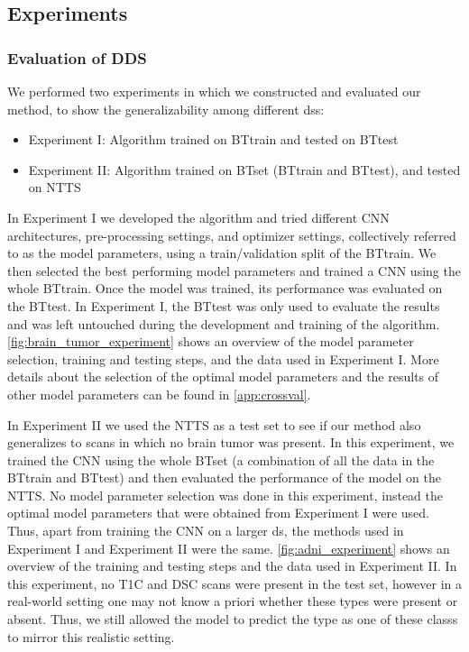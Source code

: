\subsection{Experiments}
\label{sec:experiments}

\subsubsection{Evaluation of \gls{DDS}}

We performed two experiments in which we constructed and evaluated our method, to show the generalizability among different \glspl{ds}:

\begin{itemize}
    \item Experiment I: Algorithm trained on \gls{BTtrain} and tested on \gls{BTtest}
    \item Experiment II: Algorithm trained on \gls{BTset} (\gls{BTtrain} and \gls{BTtest}), and tested on \gls{NTTS}
\end{itemize}

In Experiment I we developed the algorithm and tried different \gls{CNN} architectures, pre-processing settings, and optimizer settings, collectively referred to as the model parameters, using a train/validation split of the \gls{BTtrain}.
We then selected the best performing model parameters and trained a \gls{CNN} using the whole \gls{BTtrain}.
Once the model was trained, its performance was evaluated on the \gls{BTtest}.
In Experiment I, the \gls{BTtest} was only used to evaluate the results and was left untouched during the development and training of the algorithm.
\cref{fig:brain_tumor_experiment} shows an overview of the model parameter selection, training and testing steps, and the data used in Experiment I.
More details about the selection of the optimal model parameters and the results of other model parameters can be found in \cref{app:crossval}.

In Experiment II we used the \gls{NTTS} as a test set to see if our method also generalizes to \glspl{scan} in which no brain tumor was present.
In this experiment, we trained the \gls{CNN} using the whole \gls{BTset} (a combination of all the data in the \gls{BTtrain} and \gls{BTtest}) and then evaluated the performance of the model on the \gls{NTTS}.
No model parameter selection was done in this experiment, instead the optimal model parameters that were obtained from Experiment I were used.
Thus, apart from training the \gls{CNN} on a larger \gls{ds}, the methods used in Experiment I and Experiment II were the same.
\cref{fig:adni_experiment} shows an overview of the training and testing steps and the data used in Experiment II.
In this experiment, no \gls{T1C} and \gls{DSC} \glspl{scan} were present in the test set, however in a real-world setting one may not know a priori whether these \glspl{type} were present or absent.
Thus, we still allowed the model to predict the \gls{type} as one of these \glspl{class} to mirror this realistic setting.


